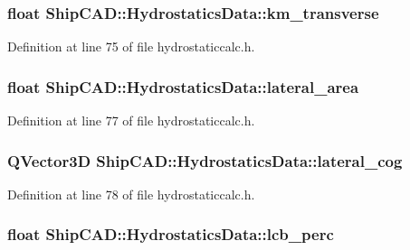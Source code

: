 \hypertarget{structShipCAD_1_1HydrostaticsData_adbadaf4eafa63f1f10778f4c3e1f61a4}{
\subsubsection[{km\-\_\-transverse}]{\setlength{\rightskip}{0pt plus 5cm}float Ship\-C\-A\-D\-::\-Hydrostatics\-Data\-::km\-\_\-transverse}}\label{structShipCAD_1_1HydrostaticsData_adbadaf4eafa63f1f10778f4c3e1f61a4}


Definition at line 75 of file hydrostaticcalc.\-h.

\hypertarget{structShipCAD_1_1HydrostaticsData_a1ba65b28e4351a4d97bc64cd11ddab90}{
\subsubsection[{lateral\-\_\-area}]{\setlength{\rightskip}{0pt plus 5cm}float Ship\-C\-A\-D\-::\-Hydrostatics\-Data\-::lateral\-\_\-area}}\label{structShipCAD_1_1HydrostaticsData_a1ba65b28e4351a4d97bc64cd11ddab90}


Definition at line 77 of file hydrostaticcalc.\-h.

\hypertarget{structShipCAD_1_1HydrostaticsData_adc0c4f2f0c5b110a968e45642dc5eeeb}{
\subsubsection[{lateral\-\_\-cog}]{\setlength{\rightskip}{0pt plus 5cm}Q\-Vector3\-D Ship\-C\-A\-D\-::\-Hydrostatics\-Data\-::lateral\-\_\-cog}}\label{structShipCAD_1_1HydrostaticsData_adc0c4f2f0c5b110a968e45642dc5eeeb}


Definition at line 78 of file hydrostaticcalc.\-h.

\hypertarget{structShipCAD_1_1HydrostaticsData_a783b71d811732bbc002b52f21d63c83a}{
\subsubsection[{lcb\-\_\-perc}]{\setlength{\rightskip}{0pt plus 5cm}float Ship\-C\-A\-D\-::\-Hydrostatics\-Data\-::lcb\-\_\-perc}}\label{structShipCAD_1_1HydrostaticsData_a783b71d811732bbc002b52f21d63c83a}



